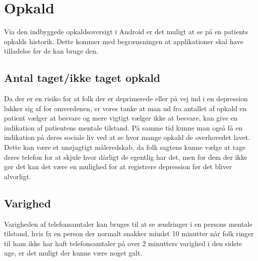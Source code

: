 \section{Opkald}
Via den indbyggede opkaldsoversigt i Android er det muligt at se på en patients opkalds historik. Dette kommer med begrænsningen at applikationer skal have tilladelse før de kan bruge den.

\subsection{Antal taget/ikke taget opkald}
Da der er en risiko for at folk der er deprimerede eller på vej ind i en depression lukker sig af for omverdenen, er vores tanke at man ud fra antallet af opkald en patient vælger at besvare og mere vigtigt vælger ikke at besvare, kan give en indikation af patientens mentale tilstand. På samme tid kunne man også få en indikation på deres sociale liv ved at se hvor mange opkald de overhovedet lavet.
Dette kan være et unøjagtigt måleredskab, da folk sagtens kunne vælge at tage deres telefon for at skjule hvor dårligt de egentlig har det, men for dem der ikke gør det kan det være en mulighed for at registrere depression før det bliver alvorligt.

\subsection{Varighed}
Varigheden af telefonsamtaler kan bruges til at se ændringer i en persons mentale tilstand, hvis fx en person der normalt snakker mindst 10 minutter når folk ringer til ham ikke har haft telefonsamtaler på over 2 minutters varighed i den sidste uge, er det muligt der kunne være noget galt.

